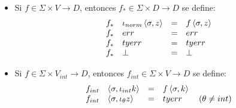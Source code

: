   \vspace{3mm}
  \begin{itemize}
    \item Si $f \in \Sigma\times V\rightarrow D$, entonces $f_* \in \Sigma\times D \rightarrow D$ se define:
      \[\begin{array}{lllllll}
        f_* & \iota_{norm}\left\langle \sigma,z\right\rangle &=& f \left\langle\sigma,z\right\rangle \\
        f_* & err &=& err \\
        f_* & tyerr &=& tyerr \\
        f_* & \bot &=& \bot
      \end{array}\]
    \item Si $f \in \Sigma\times V_{int}\rightarrow D$, entonces $f_{int} \in \Sigma\times V \rightarrow D$ se define:
      \[\begin{array}{lllllll}
        f_{int} & \left\langle \sigma,\iota_{int} k\right\rangle &=& f \left\langle\sigma,k\right\rangle \\
        f_{int} & \left\langle \sigma,\iota_{\theta} z\right\rangle &=& tyerr \qquad(\theta\neq int)
      \end{array}\]
  \end{itemize}

